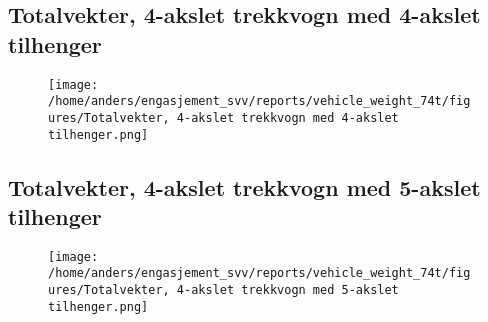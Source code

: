 \documentclass{article}
\begin{document}
\subsection{Totalvekter, 4-akslet trekkvogn med 4-akslet tilhenger}
\begin{figure}[H]
\centering
\texttt{[image: /home/anders/engasjement\_svv/reports/vehicle\_weight\_74t/figures/Totalvekter, 4-akslet trekkvogn med 4-akslet tilhenger.png]}
\end{figure}
\subsection{Totalvekter, 4-akslet trekkvogn med 5-akslet tilhenger}
\begin{figure}[H]
\centering
\texttt{[image: /home/anders/engasjement\_svv/reports/vehicle\_weight\_74t/figures/Totalvekter, 4-akslet trekkvogn med 5-akslet tilhenger.png]}
\end{figure}
\end{document}

